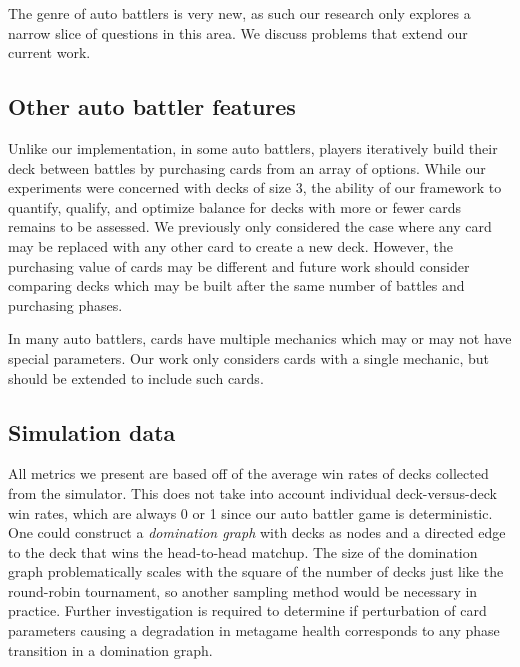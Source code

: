 
The genre of auto battlers is very new, as such our research only explores a narrow slice of questions in this area. We discuss problems that extend our current work.

\subsection{Other auto battler features}


Unlike our implementation, in some auto battlers,
players iteratively build their deck between battles by purchasing
cards from an array of options. While our experiments were concerned with decks of size 3, 
the ability of our framework to quantify, qualify, and optimize balance for decks with 
more or fewer cards remains to be assessed. We previously only considered
the case where any card may be replaced with any other card to create a new deck. However, 
the purchasing value of cards may be different and future work should consider comparing decks
which may be built after the same number of battles and purchasing phases.


In many auto battlers, cards have multiple mechanics which may or may not have special parameters.
Our work only considers cards with a single mechanic, but should be extended to include such cards.


\subsection{Simulation data}

All metrics we present are based off of the average win rates of decks collected from the simulator. 
This does not take into account individual deck-versus-deck win rates, which are always 0 or 1 since
our auto battler game is deterministic. One could construct a \textit{domination graph} with decks
as nodes and a directed edge to the deck that wins the head-to-head matchup. The size of the domination
graph problematically scales with the square of the number of decks just like the round-robin tournament,
so another sampling method would be necessary in practice. Further investigation is required to determine if perturbation of card parameters causing a degradation
in metagame health corresponds to any phase transition in a domination graph.

